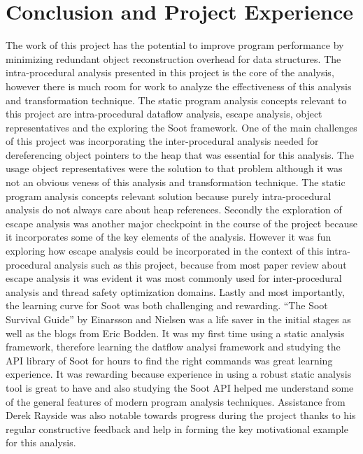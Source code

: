 \section{Conclusion and Project Experience}
The work of this project has the potential to improve program performance by minimizing redundant object reconstruction overhead for data structures. The intra-procedural analysis presented in this project is the core of the analysis, however there is much room for work to analyze the effectiveness of this analysis and transformation technique. The static program analysis concepts relevant  to this project are intra-procedural dataflow analysis, escape analysis, object representatives and the exploring the Soot framework.
One of the main challenges of this project was incorporating the inter-procedural analysis needed for dereferencing object pointers to the heap that was essential for this analysis. The usage object representatives were the solution to that problem although it was not an obvious veness of this analysis and transformation technique. The static program analysis concepts relevant solution because purely intra-procedural analysis do not always care about heap references. Secondly the exploration of escape analysis was another major checkpoint in the course of the project because it incorporates some of the key elements of the analysis. However it was fun exploring how escape analysis could be incorporated in the context of this intra-procedural analysis such as this project, because from most paper review about escape analysis it was evident it was most commonly used for inter-procedural analysis and thread safety optimization domains. Lastly and most importantly, the learning curve for Soot was both challenging and rewarding. ``The Soot Survival Guide'' \cite{ref:sootsurvival} by Einarsson and Nielsen was a life saver in the initial stages as well as the blogs from Eric Bodden. It was my first time using a static analysis framework, therefore learning the datflow analysi framework and studying the API library of Soot for hours to find the right commands was great learning experience. It was rewarding because experience in using a robust static analysis tool is great to have and also studying the Soot API helped me understand some of the general features of modern program analysis techniques. Assistance from Derek Rayside was also notable towards progress during the project thanks to his regular constructive feedback and help in forming the key motivational example for this analysis.
